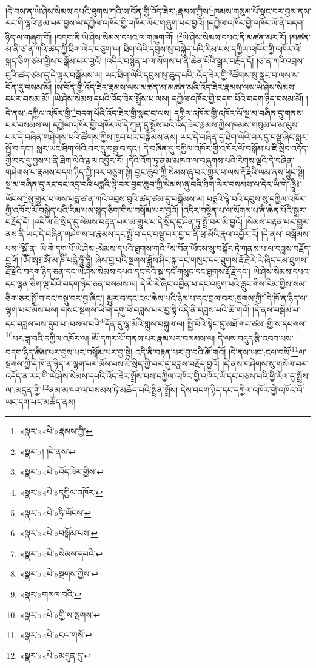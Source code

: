 །དེ་བས་ན་ཡེ་ཤེས་སེམས་དཔའི་ཐུགས་ཀའི་ས་བོན་གྱི་འོད་ཟེར་:རྣམས་ཀྱིས་\footnote{«སྣར་»«པེ་»རྣམས་ཀྱི་}ཁམས་གསུམ་པོ་སྣང་བར་བྱས་ནས་རང་གི་ལྷའི་རྣམ་པར་བྱས་ལ་དཀྱིལ་འཁོར་གྱི་འཁོར་ལོར་གཞུག་པར་བྱའོ། །དཀྱིལ་འཁོར་གྱི་འཁོར་ལོ་ནི་བདག་ཉིད་ལ་གཞུག་གོ། །བདག་ནི་ཡེ་ཤེས་སེམས་དཔའ་ལ་གཞུག་གོ། །\footnote{«སྣར་»། །དེ་ནས་}ཡེ་ཤེས་སེམས་དཔའ་ནི་མཚན་མར་རོ། །མཚན་མ་ནི་ཙ་ན་ཀའི་ཚད་ཀྱི་ཐིག་ལེར་བཅུག་ལ། ཐིག་ལེའི་དབུས་སུ་བསྐྱེད་པའི་རིམ་པས་དཀྱིལ་འཁོར་གྱི་འཁོར་ལོ་སྐད་ཅིག་ཙམ་གྱིས་བསྒོམ་པར་བྱའོ། །འདིར་བསྙེན་པ་ལ་སོགས་པ་ནི་ཆེན་པོའི་སྒྲར་བརྗོད་དོ། །ཙ་ན་ཀའི་འབྲས་བུའི་ཚད་ཙམ་དུ་དེ་ལྟར་བསྒོམས་ལ། ཡང་ཐིག་ལེའི་དབུས་སུ་ཆུད་པའི་:འོད་ཟེར་གྱི་\footnote{«སྣར་»«པེ་»འོད་ཟེར་གྱིས་}ཚོགས་སུ་སྣང་བ་ལས་ས་བོན་དུ་བསམ་མོ། །ས་བོན་གྱི་འོད་ཟེར་རྣམས་ལས་མཚན་མ་མཚན་མའི་འོད་ཟེར་རྣམས་ལས་ཡེ་ཤེས་སེམས་དཔར་བསམ་མོ། །ཡེ་ཤེས་སེམས་དཔའི་འོད་ཟེར་སྤྲོས་པ་ལས། དཀྱིལ་འཁོར་གྱི་བདག་པོའི་བདག་ཉིད་བསམ་མོ། །དེ་ནས་:དཀྱིལ་འཁོར་གྱི་\footnote{«སྣར་»«པེ་»དཀྱིལ་འཁོར་}བདག་པོའི་འོད་ཟེར་གྱི་སྣང་བ་ལས། དཀྱིལ་འཁོར་གྱི་འཁོར་ལོ་སྔ་མ་བཞིན་དུ་གནས་པར་བསམས་ལ། དཀྱིལ་འཁོར་གྱི་འཁོར་ལོ་དེ་ཀུན་དུ་སྤྲོས་པའི་འོད་ཟེར་རྣམས་ཀྱིས་ཁམས་གསུམ་པ་མ་ལུས་པར་དེ་བཞིན་གཤེགས་པའི་ཚོགས་ཀྱིས་ཁྱབ་པར་བསྒོམས་ནས། ཡང་དེ་བཞིན་དུ་ཐིག་ལེའི་བར་དུ་བསྡུ་ཞིང་སླར་སྤྲོ་བ་དང་། སླར་ཡང་ཐིག་ལེའི་བར་དུ་བསྡུ་བ་དང་། དེ་བཞིན་དུ་དཀྱིལ་འཁོར་གྱི་འཁོར་ལོ་བསྒོམ་པ་ཇི་སྲིད་འདོད་ཀྱི་བར་དུ་བྱས་པ་ནི་ཐིག་ལེའི་རྣལ་འབྱོར་རོ། །དེའི་འོག་ཏུ་ནམ་མཁའ་ལ་བཞུགས་པའི་རིགས་ལྔའི་དེ་བཞིན་གཤེགས་པ་རྣམས་བདག་ཉིད་ཀྱི་ཁར་བཅུག་སྟེ། བྱང་ཆུབ་ཀྱི་སེམས་ཞུ་བར་གྱུར་པ་ལས་རྡོ་རྗེའི་ལམ་ནས་ཕྱུང་སྟེ། སྔ་མ་བཞིན་དུ་རང་དང་འདྲ་བའི་པདྨའི་ལྟེ་བར་བྱང་ཆུབ་ཀྱི་སེམས་ཞུ་བའི་ཐིག་ལེར་བསམས་ལ་དེར་ཡི་གེ་:ཧྲཱིཿ་ཡོངས་\footnote{«སྣར་»«པེ་»ཧྲི་ཡོངས་}སུ་གྱུར་པ་ལས་པདྨ་ཙ་ན་ཀའི་འབྲས་བུའི་ཚད་ཙམ་དུ་བསྒོམས་ལ། པདྨའི་ལྟེ་བའི་དབུས་སུ་དཀྱིལ་འཁོར་གྱི་འཁོར་ལོ་བསྐྱེད་པའི་རིམ་པས་སྐད་ཅིག་གིས་བསྒོམ་པར་བྱའོ། །འདིར་བསྙེན་པ་ལ་སོགས་པ་ནི་ཆེན་པོའི་སྒྲར་བརྗོད་དོ། །འདི་ལ་ཇི་སྲིད་དུ་སེམས་བརྟན་པར་མ་གྱུར་པ་དེ་སྲིད་དུ་ཤིན་ཏུ་སྤྲོ་བར་མི་བྱའོ། །སེམས་བརྟན་པར་གྱུར་ནས་ནི་ཡང་དེ་བཞིན་གཤེགས་པ་རྣམས་དང་སྤྲོ་བ་དང་བསྡུ་བར་བྱ་བ་ནི་ཕྲ་མོའི་རྣལ་འབྱོར་རོ། །དེ་ནས་:བསྒོམས་པས་\footnote{«སྣར་»«པེ་»བསྒོམ་པས་}སྐྱོ་ན། ཡི་གེ་དགུ་པོ་ཡེ་ཤེས་:སེམས་དཔའི་ཐུགས་ཀའི་\footnote{«སྣར་»«པེ་»སེམས་དཔའི་}ས་བོན་ཡོངས་སུ་བསྐོར་ཏེ་གནས་པ་ལ་བཟླས་བརྗོད་བྱའོ། །ཨོཾ་ཨཱཿ་ཨོཾ་མ་ཎི་པདྨེ་ཧཱུྃ་ཧཱུྃ། ཞེས་བྱ་བའི་སྔགས་ཟློས་ཤིང་སྐུ་དང་གསུང་དང་ཐུགས་རྡོ་རྗེ་རེ་རེ་ཞིང་ངམ་ཐུགས་རྡོ་རྗེའི་བདག་ཉིད་ཅན་དང་ཡེ་ཤེས་སེམས་དཔའ་དང་དེའི་སྐུ་དང་གསུང་དང་ཐུགས་རྡོ་རྗེ་དང་། ཡེ་ཤེས་སེམས་དཔའ་དང་ལྷན་ཅིག་ལྔ་པོའི་བདག་ཉིད་ཅན་བསམས་ལ། དེ་རེ་རེ་ཞིང་འབྱིན་པ་དང་འཇུག་པའི་རླུང་གིས་རིམ་གྱིས་སམ་ཅིག་ཅར་སྤྲོ་བ་དང་བསྡུ་བར་བྱ་ཞིང་། མྱུར་བ་དང་ངལ་ཆེས་པའི་ཉེས་པ་དང་བྲལ་བར་:སྔགས་ཀྱི་\footnote{«སྣར་»«པེ་»སྔགས་ཀྱིས་}དེ་ཁོ་ན་ཉིད་ལ་ལྷག་པར་མོས་པས། གསང་སྔགས་ཡི་གེ་དགུ་པོ་བཟླས་པར་བྱ་སྟེ་འདི་ནི་བཟླས་པའི་ཆོ་གའོ། །དེ་ནས་བསྒོམ་པ་དང་བཟླས་པས་དུབ་པ་:བསལ་བའི་\footnote{«སྣར་»གསལ་བའི་}དོན་དུ་ལྷ་མོའི་གླུས་བསྐུལ་ལ། སྤྱི་བོའི་སྟེང་དུ་མཐོ་གང་ཙམ་:གྱི་ས་དཔགས་\footnote{«སྣར་»«པེ་»གྱི་ས་སྤགས་}པར་ཟླ་བའི་དཀྱིལ་འཁོར་ལ། ཨོཾ་དཀར་པོ་གནས་པར་རྣམ་པར་བསམས་ལ། དེ་ལས་བདུད་རྩི་འབབ་པས་བདག་ཉིད་ཚིམ་པར་བྱས་པར་བསྒོམ་པར་བྱ་སྟེ། འདི་ནི་བརྟན་པར་བྱ་བའི་ཆོ་གའོ། །དེ་ནས་ཡང་:ངལ་བསོ་\footnote{«སྣར་»«པེ་»ངལ་གསོ་}ལ་སྔགས་ཀྱི་དེ་ཁོ་ན་ཉིད་ལ་ལྷག་པར་མོས་པས་ཇི་སྲིད་ཀྱི་བར་དུ་བཟླས་བརྗོད་བྱའོ། །དེ་ནས་གཤེགས་སུ་གསོལ་བར་འདོད་ན་རང་གི་ཡེ་ཤེས་སེམས་དཔའི་འོད་ཟེར་སྤྲོས་པས་དཀྱིལ་འཁོར་གྱི་འཁོར་ལོ་དང་བཅས་པའི་ཕྱི་རོལ་དུ་སྤྲོས་ལ་:མདུན་གྱི་\footnote{«སྣར་»«པེ་»མདུན་དུ་}ནམ་མཁའ་ལ་བསམས་ཏེ་མཆོད་པའི་སྤྲིན་སྤྲོས། དེས་བདག་ཉིད་དང་དཀྱིལ་འཁོར་གྱི་འཁོར་ལོ་ཡང་དག་པར་མཆོད་ནས། 